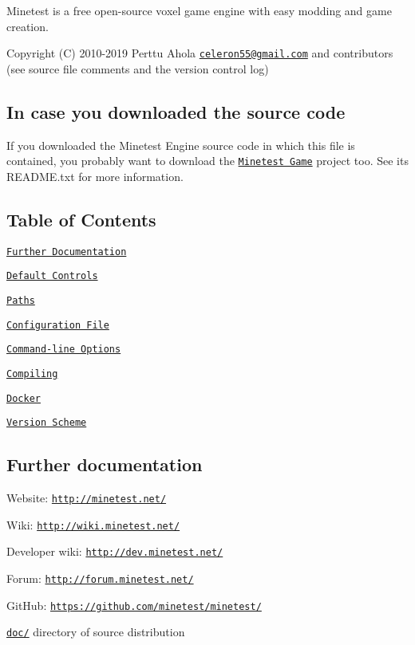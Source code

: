\href{https://travis-ci.org/minetest/minetest}{\tt } \href{https://hosted.weblate.org/engage/minetest/?utm_source=widget}{\tt } \href{https://www.gnu.org/licenses/old-licenses/lgpl-2.1.en.html}{\tt }

Minetest is a free open-\/source voxel game engine with easy modding and game creation.

Copyright (C) 2010-\/2019 Perttu Ahola \href{mailto:celeron55@gmail.com}{\tt celeron55@gmail.\+com} and contributors (see source file comments and the version control log)

\subsection*{In case you downloaded the source code }

If you downloaded the Minetest Engine source code in which this file is contained, you probably want to download the \href{https://github.com/minetest/minetest_game/}{\tt Minetest Game} project too. See its R\+E\+A\+D\+M\+E.\+txt for more information.

\subsection*{Table of Contents }


\begin{DoxyEnumerate}
\item \href{#further-documentation}{\tt Further Documentation}
\item \href{#default-controls}{\tt Default Controls}
\item \href{#paths}{\tt Paths}
\item \href{#configuration-file}{\tt Configuration File}
\item \href{#command-line-options}{\tt Command-\/line Options}
\item \href{#compiling}{\tt Compiling}
\item \href{#docker}{\tt Docker}
\item \href{#version-scheme}{\tt Version Scheme}
\end{DoxyEnumerate}

\subsection*{Further documentation }


\begin{DoxyItemize}
\item Website\+: \href{http://minetest.net/}{\tt http\+://minetest.\+net/}
\item Wiki\+: \href{http://wiki.minetest.net/}{\tt http\+://wiki.\+minetest.\+net/}
\item Developer wiki\+: \href{http://dev.minetest.net/}{\tt http\+://dev.\+minetest.\+net/}
\item Forum\+: \href{http://forum.minetest.net/}{\tt http\+://forum.\+minetest.\+net/}
\item Git\+Hub\+: \href{https://github.com/minetest/minetest/}{\tt https\+://github.\+com/minetest/minetest/}
\item \href{doc/}{\tt doc/} directory of source distribution
\end{DoxyItemize}

